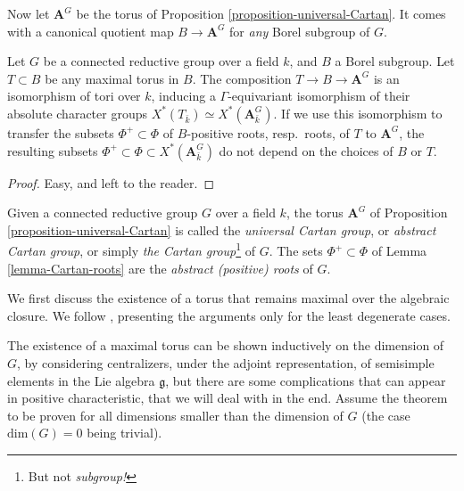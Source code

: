 Now let $\mathbf A^G$ be the torus of Proposition \ref{proposition-universal-Cartan}. It comes with a canonical quotient map $B\to \mathbf A^G$ for \emph{any} Borel subgroup of $G$.

\begin{lemma}
\label{lemma-Cartan-roots}
 Let $G$ be a connected reductive group over a field $k$, and $B$ a Borel subgroup. Let $T\subset B$ be any maximal torus in $B$. The composition $T\to B\to \mathbf A^G$ is an isomorphism of tori over $k$, inducing a $\Gamma$-equivariant isomorphism of their absolute character groups $X^*(T_{\bar k})\simeq X^*(\mathbf A^G_{\bar k})$. If we use this isomorphism to transfer the subsets $\Phi^+\subset \Phi$ of $B$-positive roots, resp.\ roots, of $T$ to $\mathbf A^G$, the resulting subsets $\Phi^+\subset \Phi\subset X^*(\mathbf A^G_{\bar k})$ do not depend on the choices of $B$ or $T$.
\end{lemma}

\begin{proof}
 Easy, and left to the reader.
\end{proof}




\begin{definition}
 \label{definition-universal-Cartan}
Given a connected reductive group $G$ over a field $k$, the torus $\mathbf A^G$ of Proposition \ref{proposition-universal-Cartan} is called the {\it universal Cartan group}, or {\it abstract Cartan group}, or simply {\it the Cartan group}\footnote{But not \emph{subgroup!}} of $G$. The sets $\Phi^+\subset \Phi$ of Lemma \ref{lemma-Cartan-roots} are the {\it abstract (positive) roots} of $G$. 
\end{definition}



















We first discuss the existence of a torus that remains maximal over the algebraic closure. We follow \cite[Theorem 18.2]{Borel-LAG}, presenting the arguments only for the least degenerate cases.
 
 The existence of a maximal torus can be shown inductively on the dimension of $G$, by considering centralizers, under the adjoint representation, of semisimple elements in the Lie algebra $\mathfrak g$, but there are some complications that can appear in positive characteristic, that we will deal with in the end. Assume the theorem to be proven for all dimensions smaller than the dimension of $G$ (the case $\text{dim}(G)=0$ being trivial).
 

